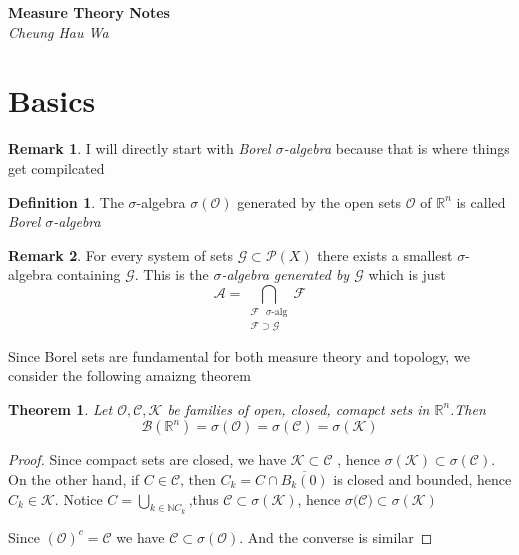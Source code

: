 \documentclass{article}
\newtheorem{theorem}{Theorem}[section]
\theoremstyle{definition}
\newtheorem{definition}{Definition}[section]
\newtheorem*{remark}{Remark}
\newcommand{\m}[1]{$ #1 $}
\begin{document}
	

\begin{titlepage}
   \begin{center}
      \Large\textbf{Measure Theory Notes}\\
      \large\textit{Cheung Hau Wa}
   \end{center}
\end{titlepage}
\section{Basics}
\begin{remark}
	I will directly start with \textit{Borel $\sigma$-algebra} because that is where things get compilcated
\end{remark}
\begin{definition}
	The $\sigma$-algebra $\sigma(\mathscr{O})$ generated by the open sets $\mathscr{O}$ of $\mathbb{R}^n$ is called \textit{Borel $\sigma$-algebra}
\end{definition}
\begin{remark}
	For every system of sets $\mathscr{G} \subset \mathscr{P}(X)$ there exists a smallest $\sigma$-algebra containing $\mathscr{G}$. This is the \textit{$\sigma$-algebra generated by $\mathscr{G}$} which is just \begin{equation*}
		\mathscr{A} = \bigcap_{\substack{\mathscr{F} \text{ }\sigma\text{-alg} \\ \mathscr{F} \supset \mathscr{G}}} \mathscr{F}
	\end{equation*}
\end{remark}
	
Since Borel sets are fundamental for both measure theory and topology, we consider the following amaizng theorem
\begin{theorem}
	Let $\mathscr{O,C,K}$ be families of open, closed, comapct sets in $\mathbb{R}^n$.Then 
	\begin{equation*}
		\mathscr{B}(\mathbb{R}^n) = \sigma(\mathscr{O}) = \sigma(\mathscr{C}) = \sigma(\mathscr{K})
	\end{equation*}
\end{theorem}
\begin{proof}
	Since compact sets are closed, we have $\mathscr{K} \subset \mathscr{C}$ , hence $\sigma(\mathscr{K}) \subset \sigma(\mathscr{C})$. On the other hand, if $C \in \mathscr{C} \text{, then } C_k = C \cap \overline{B_k(0)} $ is closed and bounded, hence $C_k \in \mathscr{K}$. Notice \m{C = \bigcup_{k \in \mathbb{N} C_k}},thus \m{\mathscr{C} \subset \sigma(\mathscr{K})}, hence \m{\sigma(\mathscr{C)} \subset \sigma(\mathscr{K})}

	Since \m{(\mathscr{O})^c=\mathscr{C}} we have \m{\mathscr{C} \subset \sigma(\mathscr{O})}.
	And the converse is similar
\end{proof}
\end{document}

